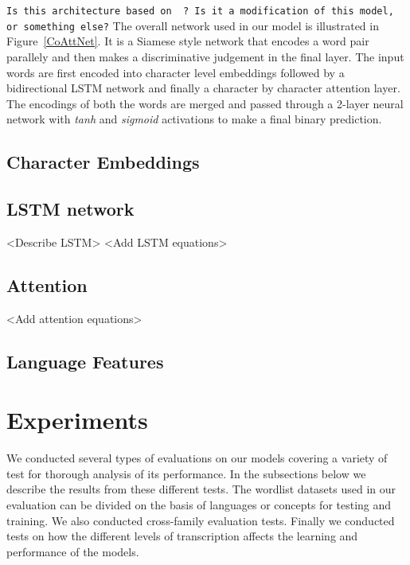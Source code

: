 \documentclass[11pt,letterpaper]{article}
\begin{document}
\texttt{Is this architecture based on \cite{rocktaschel2016reasoning} ? Is it a modification of this model, or something else?}
The overall network used in our model is illustrated in Figure~\ref{CoAttNet}. It is a Siamese style network that encodes a word pair parallely and then makes a discriminative judgement in the final layer. The input words are first encoded into character level embeddings followed by a bidirectional LSTM network and finally a character by character attention layer. The encodings of both the words are merged and passed through a 2-layer neural network with \textit{tanh} and \textit{sigmoid} activations to make a final binary prediction. 

\subsection{Character Embeddings}

\subsection{LSTM network}

<Describe LSTM>
<Add LSTM equations>

\subsection{Attention}

<Add attention equations>

\subsection{Language Features}


\section{Experiments}

We conducted several types of evaluations on our models covering a variety of test for thorough analysis of its performance. In the subsections below we describe the results from these different tests.
The wordlist datasets used in our evaluation can be divided on the basis of languages or concepts for testing and training. We also conducted cross-family evaluation tests. Finally we conducted tests on how the different levels of transcription affects the learning and performance of the models.
\end{document}
